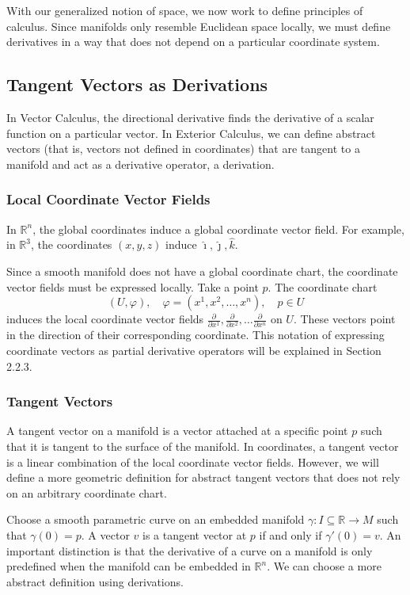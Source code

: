 \documentclass[12pt]{article}
\newcommand{\R}{\mathbb{R}}
\newcommand{\p}{\partial}
\newcommand{\ihat}{\hat{\imath}}
\newcommand{\jhat}{\hat{\jmath}}
\newcommand{\khat}{\hat{k}}
\begin{document}
With our generalized notion of space, we now work to define principles of calculus. Since manifolds only resemble Euclidean space locally, we must define derivatives in a way that does not depend on a particular coordinate system.

\subsection{Tangent Vectors as Derivations}
In Vector Calculus, the directional derivative finds the derivative of a scalar function on a particular vector. In Exterior Calculus, we can define abstract vectors (that is, vectors not defined in coordinates) that are tangent to a manifold and act as a derivative operator, a derivation.
\subsubsection{Local Coordinate Vector Fields}
In $\R^n$, the global coordinates induce a global coordinate vector field. For example, in $\R^3$, the coordinates $(x,y,z)$ induce $\ihat, \jhat, \khat$.

Since a smooth manifold does not have a global coordinate chart, the coordinate vector fields must be expressed locally. Take a point $p$. The coordinate chart
\[
(U,\varphi), \quad \varphi = (x^1,x^2, \dots, x^n), \quad p\in U
\]
induces the local coordinate vector fields $\frac{\p}{\p x^1}, \frac{\p}{\p x^2},\dots \frac{\p}{\p x^n}$ on $U$. These vectors point in the direction of their corresponding coordinate. This notation of expressing coordinate vectors as partial derivative operators will be explained in Section 2.2.3.
\subsubsection{Tangent Vectors}
A tangent vector on a manifold is a vector attached at a specific point $p$ such that it is tangent to the surface of the manifold. In coordinates, a tangent vector is a linear combination of the local coordinate vector fields. However, we will define a more geometric definition for abstract tangent vectors that does not rely on an arbitrary coordinate chart.

Choose a smooth parametric curve on an embedded manifold $\gamma:I \subseteq \R \to M$ such that $\gamma(0)=p$. A vector $v$ is a tangent vector at $p$ if and only if $\gamma'(0) = v$. An important distinction is that the derivative of a curve on a manifold is only predefined when the manifold can be embedded in $\R^n$. We can choose a more abstract definition using derivations. 
\end{document}
